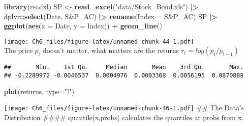 \documentclass[
]{article}
\newenvironment{Shaded}{\begin{snugshade}}{\end{snugshade}}
\newcommand{\AttributeTok}[1]{\textcolor[rgb]{0.13,0.29,0.53}{#1}}
\newcommand{\FunctionTok}[1]{\textcolor[rgb]{0.13,0.29,0.53}{\textbf{#1}}}
\newcommand{\NormalTok}[1]{#1}
\newcommand{\OtherTok}[1]{\textcolor[rgb]{0.56,0.35,0.01}{#1}}
\newcommand{\SpecialCharTok}[1]{\textcolor[rgb]{0.81,0.36,0.00}{\textbf{#1}}}
\newcommand{\StringTok}[1]{\textcolor[rgb]{0.31,0.60,0.02}{#1}}
\begin{document}
\begin{Shaded}
\begin{Highlighting}[]
\FunctionTok{library}\NormalTok{(readxl)}
\NormalTok{SP }\OtherTok{\textless{}{-}} \FunctionTok{read\_excel}\NormalTok{(}\StringTok{"data/Stock\_Bond.xls"}\NormalTok{) }\SpecialCharTok{|\textgreater{}}\NormalTok{ dplyr}\SpecialCharTok{::}\FunctionTok{select}\NormalTok{(Date, }\StringTok{\textasciigrave{}}\AttributeTok{S\&P\_AC}\StringTok{\textasciigrave{}}\NormalTok{) }\SpecialCharTok{|\textgreater{}}
  \FunctionTok{rename}\NormalTok{(}\AttributeTok{Index =} \StringTok{\textasciigrave{}}\AttributeTok{S\&P\_AC}\StringTok{\textasciigrave{}}\NormalTok{)}
\NormalTok{SP }\SpecialCharTok{|\textgreater{}} \FunctionTok{ggplot}\NormalTok{(}\FunctionTok{aes}\NormalTok{(}\AttributeTok{x =}\NormalTok{ Date, }\AttributeTok{y =}\NormalTok{ Index)) }\SpecialCharTok{+} \FunctionTok{geom\_line}\NormalTok{()}
\end{Highlighting}
\end{Shaded}

\texttt{[image: Ch6\_files/figure-latex/unnamed-chunk-44-1.pdf]}\\
The price \(p_t\) doesn't matter, what matters are the returns
\(r_t=log(p_t/p_{t-1})\)

\begin{Shaded}
\end{Shaded}

\begin{verbatim}
##       Min.    1st Qu.     Median       Mean    3rd Qu.       Max. 
## -0.2289972 -0.0046537  0.0004976  0.0003368  0.0056195  0.0870888
\end{verbatim}

\begin{Shaded}
\begin{Highlighting}[]
\FunctionTok{plot}\NormalTok{(returns, }\AttributeTok{type=}\StringTok{"l"}\NormalTok{)}
\end{Highlighting}
\end{Shaded}

\texttt{[image: Ch6\_files/figure-latex/unnamed-chunk-46-1.pdf]} \#\# The
Data's Distribution \#\#\#\# quantile(x,probs) calculates the quantiles
at probs from x.
\end{document}
